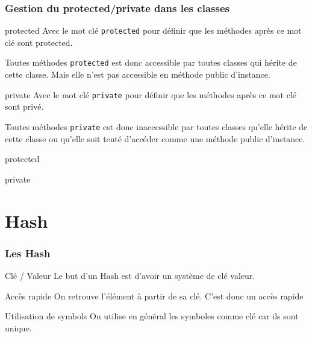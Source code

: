 \documentclass{beamer}
\begin{document}
\begin{frame}
  \frametitle{Gestion du protected/private dans les classes}
  \begin{block}{protected}
    Avec le mot cl\'e \verb?protected? pour d\'efinir que les m\'ethodes
    après ce mot cl\'e sont protected.

    Toutes m\'ethodes \verb?protected? est donc accessible par toutes classes
    qui h\'erite de cette classe. Mais elle n'est pas accessible en m\'ethode
    public d'instance.
  \end{block}
  \begin{block}{private}
    Avec le mot cl\'e \verb?private? pour d\'efinir que les m\'ethodes
    après ce mot cl\'e sont priv\'e.

    Toutes m\'ethodes \verb?private? est donc inaccessible par toutes classes
    qu'elle h\'erite de cette classe ou qu'elle soit tent\'e d'acc\'eder comme
    une m\'ethode public d'instance.
  \end{block}
\end{frame}

\begin{frame}
  \begin{beamerboxesrounded}{protected}
    
  \end{beamerboxesrounded}
\end{frame}

\begin{frame}
  \begin{beamerboxesrounded}{private}
    
  \end{beamerboxesrounded}
\end{frame}

\section{Hash}

\begin{frame}
  \frametitle{Les Hash}
  \begin{block}{Cl\'e / Valeur}
    Le but d'un Hash est d'avoir un système de cl\'e valeur.
  \end{block}
  \begin{block}{Accès rapide}
    On retrouve l'\'el\'ement à partir de sa cl\'e. C'est donc un accès rapide
  \end{block}
  \begin{block}{Utilisation de symbols}
    On utilise en g\'en\'eral les symboles comme cl\'e car ils sont
    unique.
  \end{block}
\end{frame}
\end{document}
